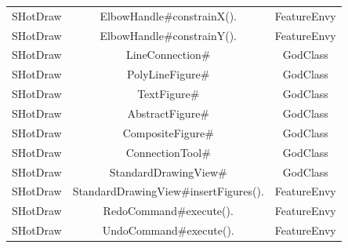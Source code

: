 \documentclass[onecolumn]{article}
\begin{document}
\begin{tabular}{|c c c|}
SHotDraw & ElbowHandle\#constrainX(). & FeatureEnvy \\
SHotDraw & ElbowHandle\#constrainY(). & FeatureEnvy \\
SHotDraw & LineConnection\# & GodClass \\
SHotDraw & PolyLineFigure\# & GodClass \\
SHotDraw & TextFigure\# & GodClass \\
SHotDraw & AbstractFigure\# & GodClass \\
SHotDraw & CompositeFigure\# & GodClass \\
SHotDraw & ConnectionTool\# & GodClass \\
SHotDraw & StandardDrawingView\# & GodClass \\
SHotDraw & StandardDrawingView\#insertFigures(). & FeatureEnvy \\
SHotDraw & RedoCommand\#execute(). & FeatureEnvy \\
SHotDraw & UndoCommand\#execute(). & FeatureEnvy \\
 \hline
 \end{tabular}
 
\end{document}
